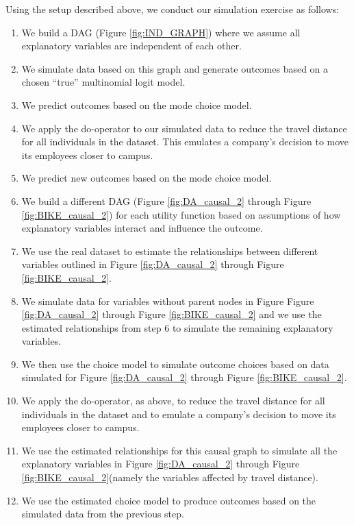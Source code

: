 Using the setup described above, we conduct our simulation exercise as follows:
\begin{enumerate}

\item We build a DAG (Figure \ref{fig:IND_GRAPH}) where we assume all explanatory variables are independent of each other.
\item We simulate data based on this graph and generate outcomes based on a chosen ``true'' multinomial logit model.
\item We predict outcomes based on the mode choice model.
\item We apply the do-operator \citet{pearl_causality_2000} to our simulated data to reduce the travel distance for all individuals in the dataset. This emulates a company's decision to move its employees closer to campus.
\item We predict new outcomes based on the mode choice model.\newline
\item We build a different DAG (Figure \ref{fig:DA_causal_2} through Figure \ref{fig:BIKE_causal_2}) for each utility function based on assumptions of how explanatory variables interact and influence the outcome.
\item We use the real dataset to estimate the relationships between different variables outlined in Figure \ref{fig:DA_causal_2} through Figure \ref{fig:BIKE_causal_2}.
\item We simulate data for variables without parent nodes in Figure Figure \ref{fig:DA_causal_2} through Figure \ref{fig:BIKE_causal_2} and we use the estimated relationships from step 6 to simulate the remaining explanatory variables.
\item We then use the choice model to simulate outcome choices based on data simulated for Figure \ref{fig:DA_causal_2} through Figure \ref{fig:BIKE_causal_2}.
\item We apply the do-operator, as above, to reduce the travel distance for all individuals in the dataset and to emulate a company's decision to move its employees closer to campus.
\item We use the estimated relationships for this causal graph to simulate all the explanatory variables in Figure \ref{fig:DA_causal_2} through Figure \ref{fig:BIKE_causal_2}(namely the variables affected by travel distance).
\item We use the estimated choice model to produce outcomes based on the simulated data from the previous step.

\end{enumerate}

